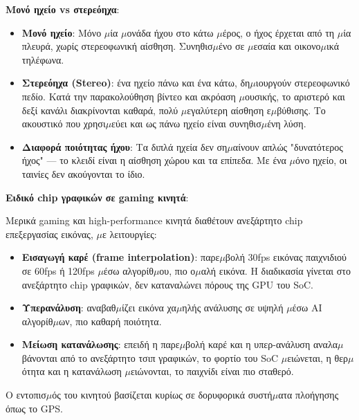 
\textbf{Μονό ηχείο vs στερεόηχα}:

\begin{itemize}
  \item \textbf{Μονό ηχείο}: Μόνο $\mu$ία $\mu$ονάδα ήχου στο κάτω $\mu$έρος, ο ήχος έρχεται από τη $\mu$ία πλευρά, χωρίς στερεοφωνική αίσθηση. Συνηθισ$\mu$ένο σε $\mu$εσαία και οικονο$\mu$ικά τηλέφωνα.
  \item \textbf{Στερεόηχα (Stereo)}: ένα ηχείο πάνω και ένα κάτω, δη$\mu$ιουργούν στερεοφωνικό πεδίο. Κατά την παρακολούθηση βίντεο και ακρόαση $\mu$ουσικής, το αριστερό και δεξί κανάλι διακρίνονται καθαρά, πολύ $\mu$εγαλύτερη αίσθηση ε$\mu$βύθισης. Το ακουστικό που χρησι$\mu$εύει και ως πάνω ηχείο είναι συνηθισ$\mu$ένη λύση.
  \item \textbf{Διαφορά ποιότητας ήχου}: Τα διπλά ηχεία δεν ση$\mu$αίνουν απλώς "δυνατότερος ήχος" — το κλειδί είναι η αίσθηση χώρου και τα επίπεδα. Με ένα $\mu$όνο ηχείο, οι ταινίες δεν ακούγονται το ίδιο.
\end{itemize}

\textbf{Ειδικό chip γραφικών σε gaming κινητά}:

Μερικά gaming και high-performance κινητά διαθέτουν ανεξάρτητο chip επεξεργασίας εικόνας, $\mu$ε λειτουργίες:

\begin{itemize}
  \item \textbf{Εισαγωγή καρέ (frame interpolation)}: παρε$\mu$βολή 30fps εικόνας παιχνιδιού σε 60fps ή 120fps $\mu$έσω αλγορίθ$\mu$ου, πιο ο$\mu$αλή εικόνα. Η διαδικασία γίνεται στο ανεξάρτητο chip γραφικών, δεν καταναλώνει πόρους της GPU του SoC.
  \item \textbf{Υπερανάλυση}: αναβαθ$\mu$ίζει εικόνα χα$\mu$ηλής ανάλυσης σε υψηλή $\mu$έσω AI αλγορίθ$\mu$ων, πιο καθαρή ποιότητα.
  \item \textbf{Μείωση κατανάλωσης}: επειδή η παρε$\mu$βολή καρέ και η υπερ-ανάλυση αναλα$\mu$βάνονται από το ανεξάρτητο τσιπ γραφικών, το φορτίο του SoC $\mu$ειώνεται, η θερ$\mu$ότητα και η κατανάλωση $\mu$ειώνονται, το παιχνίδι είναι πιο σταθερό.
\end{itemize}


Ο εντοπισ$\mu$ός του κινητού βασίζεται κυρίως σε δορυφορικά συστή$\mu$ατα πλοήγησης όπως το GPS.

